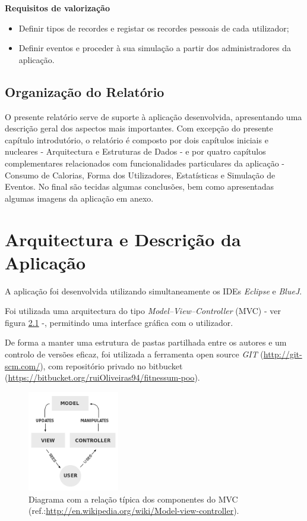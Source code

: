 \documentclass[a4paper,10pt]{report}
\begin{document}
\textbf{Requisitos de valorização}
\begin{itemize}
\item Definir tipos de recordes e registar os recordes pessoais de cada utilizador;
\item Definir eventos e proceder à sua simulação a partir dos administradores da aplicação.
\end{itemize}

\section{Organização do Relatório}
\label{sec:org}
O presente relatório serve de suporte à aplicação desenvolvida, apresentando uma descrição geral dos aspectos mais importantes.
Com excepção do presente capítulo introdutório, o relatório é composto por dois capítulos iniciais e nucleares  - Arquitectura e 
Estruturas de Dados - e por quatro capítulos complementares relacionados com funcionalidades particulares da aplicação - Consumo de Calorias, 
Forma dos Utilizadores, Estatísticas e Simulação de Eventos. No final são tecidas algumas conclusões, bem como apresentadas algumas imagens da
aplicação em anexo.

\chapter{Arquitectura e Descrição da Aplicação}
\label{cap:arq}

A aplicação foi desenvolvida utilizando simultaneamente os IDEs \emph{Eclipse} e \emph{BlueJ}.

Foi utilizada uma arquitectura do tipo \emph{Model–View–Controller} (MVC) - ver figura \ref{fig:mvc} -, 
permitindo uma interface gráfica com o utilizador.

De forma a manter uma estrutura de pastas partilhada entre os autores e um controlo de versões eficaz, 
foi utilizada a ferramenta open source \emph{GIT} (\url{http://git-scm.com/}), 
com repositório privado no bitbucket (\url{https://bitbucket.org/ruiOliveiras94/fitnessum-poo}).

\begin{figure}
\centering
\includegraphics[width=4cm]{MVC-Process.png}
\caption{Diagrama com a relação típica dos componentes do MVC (ref.:\url{http://en.wikipedia.org/wiki/Model-view-controller}).}
\label{fig:mvc}
\end{figure}
\end{document}
